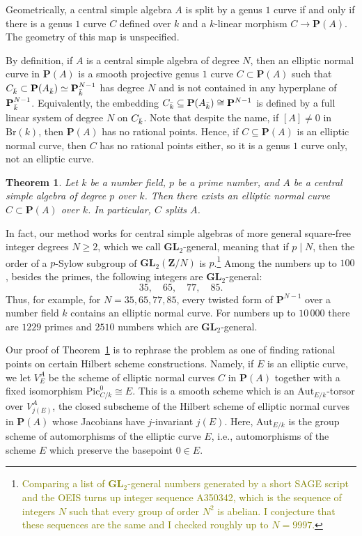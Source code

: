 \documentclass[10pt,letterpaper,twoside]{article}
\newcommand{\BA}[1]{\textcolor{olive}{#1}}
\renewcommand{\1}{\mathbf{1}}
\newcommand{\bP}{\mathbf{P}}
\newcommand{\bZ}{\mathbf{Z}}
\newcommand{\Aut}{\mathrm{Aut}}
\renewcommand{\geq}{\geqslant}
\newcommand{\GL}{\mathbf{GL}}
\newcommand{\Pic}{\mathrm{Pic}}
\newcommand{\Br}{\mathrm{Br}}
\newcommand{\iso}{\cong}
\theoremstyle{plain}
\newtheorem{theorem}{Theorem}[section]
\theoremstyle{plain}
\theoremstyle{definition}
\theoremstyle{named}
\theoremstyle{definition}
\begin{document}
	Geometrically, a central simple algebra $A$ is split by a genus $1$ curve if and only if there is a genus $1$ curve $C$
	defined over $k$ and a $k$-linear morphism $C\rightarrow\bP(A)$. The geometry of this map is
	unspecified.
	
	By definition, if $A$ is a central simple algebra of degree $N$, then an elliptic normal curve in $\bP(A)$ is a
	smooth projective genus $1$ curve $C\subset \bP(A)$ such that $C_{\Bar{k}}\subset
	\bP(A_{\Bar{k}})\simeq \bP_{\Bar{k}}^{N-1}$ has degree $N$ and is not contained in any hyperplane of
	$\bP_{\Bar{k}}^{N-1}$.
	Equivalently, the embedding
	$C_{\Bar{k}}\subseteq\bP(A_{\Bar{k}})\iso\bP^{N-1}$ is defined by a full linear system of degree $N$
	on $C_{\Bar{k}}$. Note that despite the name, if $[A]\neq 0$ in $\Br(k)$, then $\bP(A)$ has no
	rational points. Hence, if $C\subseteq\bP(A)$ is an elliptic normal curve, then $C$ has no rational points either, so it is a
	genus $1$ curve only, not an elliptic curve.
	
	\begin{theorem}\label{mainthm}
		Let $k$ be a number field, $p$ be a prime number, and $A$ be a central simple algebra of degree
		$p$ over $k$. Then there exists an elliptic normal curve $C\subset \bP(A)$ over $k$. In
		particular, $C$ splits $A$.
	\end{theorem}
	
	In fact, our method works for central simple algebras of more general square-free integer degrees
	$N\geq 2$, which we
	call $\GL_2$-general, meaning that if $p\;|\;N$, then the order of a $p$-Sylow subgroup of
	$\GL_2(\bZ/N)$ is $p$.\footnote{\BA{Comparing a list of $\GL_2$-general numbers generated by a short
			{\ttfamily SAGE} script and the {\ttfamily OEIS} turns up integer sequence {\ttfamily A350342},
			which is the sequence of integers $N$ such that every group of order $N^2$ is abelian. I conjecture
			that these sequences are the same and I checked roughly up to $N=9997$.}} Among the numbers up to $100$, besides the primes, the following integers are
	$\GL_2$-general:
	$$35,\quad 65,\quad 77,\quad 85.$$
	Thus, for example, for $N=35,65,77,85$, every twisted form of $\bP^{N-1}$ over a number field $k$ contains an
	elliptic normal curve. For numbers up to $10\,000$ there are $1229$ primes and $2510$ numbers which
	are $\GL_2$-general.
	
	Our proof of Theorem~\ref{mainthm} is to rephrase the problem as one of finding rational points on
	certain Hilbert scheme constructions. Namely, if $E$ is an elliptic curve, we let $V_E^A$ be the scheme of elliptic normal curves
	$C$ in $\bP(A)$ together with a fixed isomorphism $\Pic_{C/k}^0\iso E$.
	This is a smooth scheme which is an $\Aut_{E/k}$-torsor over $V_{j(E)}^A$, the closed subscheme of the
	Hilbert scheme of elliptic normal curves in $\bP(A)$ whose Jacobians have $j$-invariant $j(E)$.
	Here, $\Aut_{E/k}$ is the group scheme of automorphisms of the elliptic curve $E$, i.e.,
	automorphisms of the scheme $E$ which preserve the basepoint $0\in E$.
	
\end{document}
